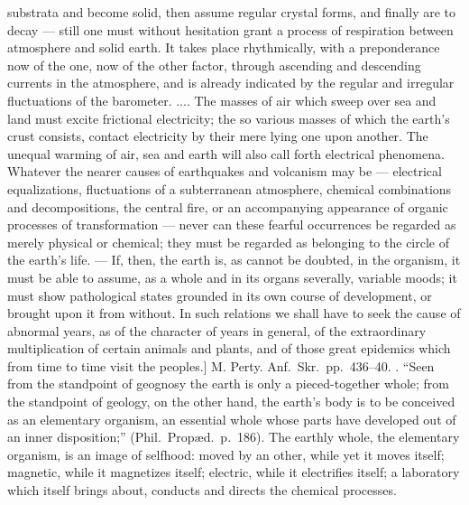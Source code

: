 \documentclass[12pt,a4paper]{book}
\begin{document}
{substrata and become solid, then assume regular crystal forms, and finally are
to decay --- still one must without hesitation grant a process of respiration
between atmosphere and solid earth. It takes place rhythmically, with a
preponderance now of the one, now of the other factor, through ascending and
descending currents in the atmosphere, and is already indicated by the regular
and irregular fluctuations of the barometer. .... The masses of air which sweep
over sea and land must excite frictional electricity; the so various masses of
which the earth's crust consists, contact electricity by their mere lying one
upon another. The unequal warming of air, sea and earth will also call forth
electrical phenomena. Whatever the nearer causes of earthquakes and volcanism
may be --- electrical equalizations, fluctuations of a subterranean atmosphere,
chemical combinations and decompositions, the central fire, or an accompanying
appearance of organic processes of transformation --- never can these fearful
occurrences be regarded as merely physical or chemical; they must be regarded
as belonging to the circle of the earth's life. --- If, then, the earth is, as
cannot be doubted, in the organism, it must be able to assume, as a whole and
in its organs severally, variable moods; it must show pathological states
grounded in its own course of development, or brought upon it from without. In
such relations we shall have to seek the cause of abnormal years, as of the
character of years in general, of the extraordinary multiplication of certain
animals and plants, and of those great epidemics which from time to time visit
the peoples.] M. Perty. Anf.\ Skr.\ pp.~436--40.
}. ``Seen from the standpoint of geognosy
the earth is only a pieced-together whole; from the standpoint of geology, on
the other hand, the earth's body is to be conceived as an elementary organism,
an essential whole whose parts have developed out of an inner disposition;''
(Phil.\ Propæd.\ p.~186). The earthly whole, the elementary organism, is an
image of selfhood: moved by an other, while yet it moves itself; magnetic,
while it magnetizes itself; electric, while it electrifies itself; a laboratory
which itself brings about, conducts and directs the chemical processes.
\end{document}
